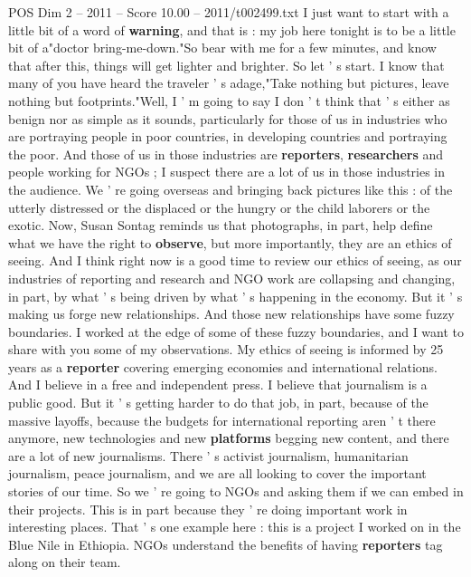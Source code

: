 \begin{textsample}{POS Dim 2 – 2011 – Score 10.00 – 2011/t002499.txt}  \label{ex:f2_pos_084}
I just want to start with a little bit of a word of \textbf{warning}, and that is : my job here tonight is to be a little bit of a"doctor bring-me-down."So bear with me for a few minutes, and know that after this, things will get lighter and brighter.
So let ' s start.
I know that many of you have heard the traveler ' s adage,"Take nothing but pictures, leave nothing but footprints."Well, I ' m going to say I don ' t think that ' s either as benign nor as simple as it sounds, particularly for those of us in industries who are portraying people in poor countries, in developing countries and portraying the poor.
And those of us in those industries are \textbf{reporters}, \textbf{researchers} and people working for NGOs ; I suspect there are a lot of us in those industries in the audience.
We ' re going overseas and bringing back pictures like this : of the utterly distressed or the displaced or the hungry or the child laborers or the exotic.
Now, Susan Sontag reminds us that photographs, in part, help define what we have the right to \textbf{observe}, but more importantly, they are an ethics of seeing.
And I think right now is a good time to review our ethics of seeing, as our industries of reporting and research and NGO work are collapsing and changing, in part, by what ' s being driven by what ' s happening in the economy.
But it ' s making us forge new relationships.
And those new relationships have some fuzzy boundaries.
I worked at the edge of some of these fuzzy boundaries, and I want to share with you some of my observations.
My ethics of seeing is informed by 25 years as a \textbf{reporter} covering emerging economies and international relations.
And I believe in a free and independent press.
I believe that journalism is a public good.
But it ' s getting harder to do that job, in part, because of the massive layoffs, because the budgets for international reporting aren ' t there anymore, new technologies and new \textbf{platforms} begging new content, and there are a lot of new journalisms.
There ' s activist journalism, humanitarian journalism, peace journalism, and we are all looking to cover the important stories of our time.
So we ' re going to NGOs and asking them if we can embed in their projects.
This is in part because they ' re doing important work in interesting places.
That ' s one example here : this is a project I worked on in the Blue Nile in Ethiopia.
NGOs understand the benefits of having \textbf{reporters} tag along on their team.

\end{textsample}
